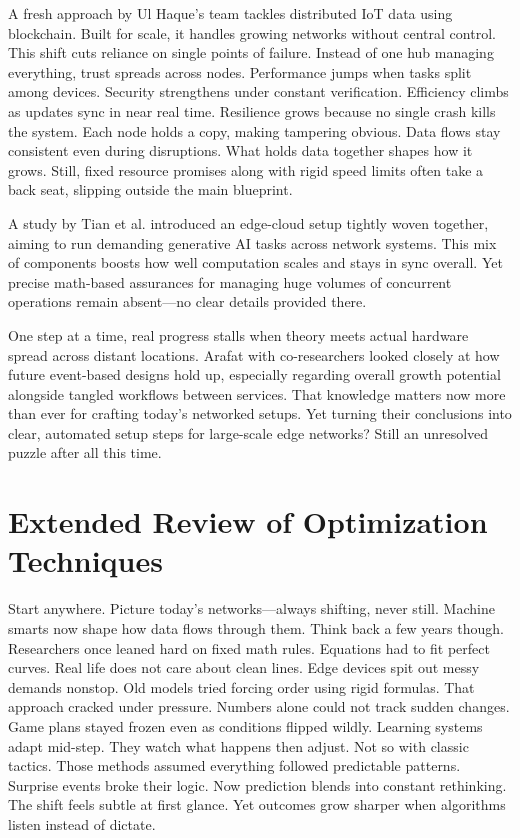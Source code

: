 \documentclass[a4paper,fleqn]{cas-dc}
\numberwithin{equation}{section}
\begin{document}
A fresh approach by Ul Haque's team \cite{UlHaque2024Scalable} tackles distributed IoT data using blockchain. Built for scale, it handles growing networks without central control. This shift cuts reliance on single points of failure. Instead of one hub managing everything, trust spreads across nodes. Performance jumps when tasks split among devices. Security strengthens under constant verification. Efficiency climbs as updates sync in near real time. Resilience grows because no single crash kills the system. Each node holds a copy, making tampering obvious. Data flows stay consistent even during disruptions. What holds data together shapes how it grows. Still, fixed resource promises along with rigid speed limits often take a back seat, slipping outside the main blueprint.

A study by Tian et al. \cite{Tian2024EdgeCloud} introduced an edge-cloud setup tightly woven together, aiming to run demanding generative AI tasks across network systems. This mix of components boosts how well computation scales and stays in sync overall. Yet precise math-based assurances for managing huge volumes of concurrent operations remain absent—no clear details provided there.

One step at a time, real progress stalls when theory meets actual hardware spread across distant locations. Arafat with co-researchers \cite{Arafat2025NextGen} looked closely at how future event-based designs hold up, especially regarding overall growth potential alongside tangled workflows between services. That knowledge matters now more than ever for crafting today's networked setups. Yet turning their conclusions into clear, automated setup steps for large-scale edge networks? Still an unresolved puzzle after all this time.

\section{Extended Review of Optimization Techniques}

Start anywhere. Picture today's networks—always shifting, never still. Machine smarts now shape how data flows through them. Think back a few years though. Researchers once leaned hard on fixed math rules. Equations had to fit perfect curves. Real life does not care about clean lines. Edge devices spit out messy demands nonstop. Old models tried forcing order using rigid formulas. That approach cracked under pressure. Numbers alone could not track sudden changes. Game plans stayed frozen even as conditions flipped wildly. Learning systems adapt mid-step. They watch what happens then adjust. Not so with classic tactics. Those methods assumed everything followed predictable patterns. Surprise events broke their logic. Now prediction blends into constant rethinking. The shift feels subtle at first glance. Yet outcomes grow sharper when algorithms listen instead of dictate.
\end{document}
